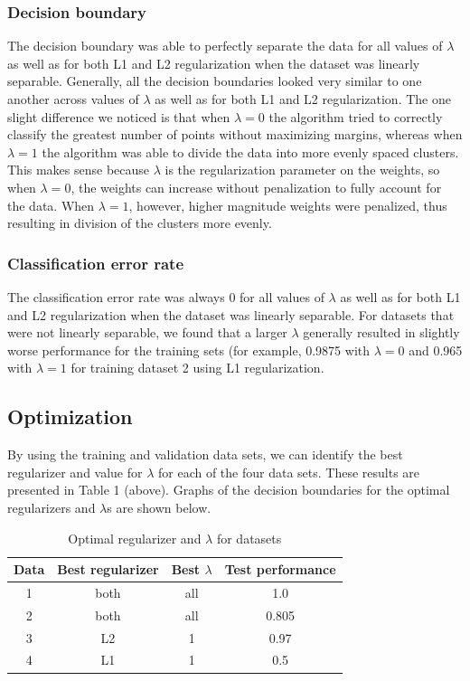 \documentclass{article}
\begin{document}
\subsubsection{Decision boundary}
The decision boundary was able to perfectly separate the data for all values of $\lambda$ as well as for both L1 and L2 regularization when the dataset was linearly separable. Generally, all the decision boundaries looked very similar to one another across values of $\lambda$ as well as for both L1 and L2 regularization. The one slight difference we noticed is that when $\lambda = 0$ the algorithm tried to correctly classify the greatest number of points without maximizing margins, whereas when $\lambda=1$ the algorithm was able to divide the data into more evenly spaced clusters. This makes sense because $\lambda$ is the regularization parameter on the weights, so when $\lambda = 0$, the weights can increase without penalization to fully account for the data. When $\lambda = 1$, however, higher magnitude weights were penalized, thus resulting in division of the clusters more evenly.

\subsubsection{Classification error rate}
The classification error rate was always $0$ for all values of $\lambda$ as well as for both L1 and L2 regularization when the dataset was linearly separable. For datasets that were not linearly separable, we found that a larger $\lambda$ generally resulted in slightly worse performance for the training sets (for example, 0.9875 with $\lambda = 0$ and 0.965 with $\lambda = 1$ for training dataset 2 using L1 regularization.

\subsection{Optimization}
By using the training and validation data sets, we can identify the best regularizer and value for $\lambda$ for each of the four data sets. These results are presented in Table 1 (above). Graphs of the decision boundaries for the optimal regularizers and $\lambda$s are shown below.

\begin{table}
  \begin{center}
    \begin{tabular}{ | c | c | c | c | }
      \hline
      Data & Best regularizer & Best $\lambda$ & Test performance \\ \hline
      1       & both           & all            & 1.0 \\ \hline
      2       & both           & all            & 0.805 \\ \hline
      3       & L2               & 1             & 0.97 \\ \hline
      4       & L1               & 1             & 0.5 \\ \hline
    \end{tabular}
  \end{center}
  \caption{Optimal regularizer and $\lambda$ for datasets}
\end{table}
\end{document}
